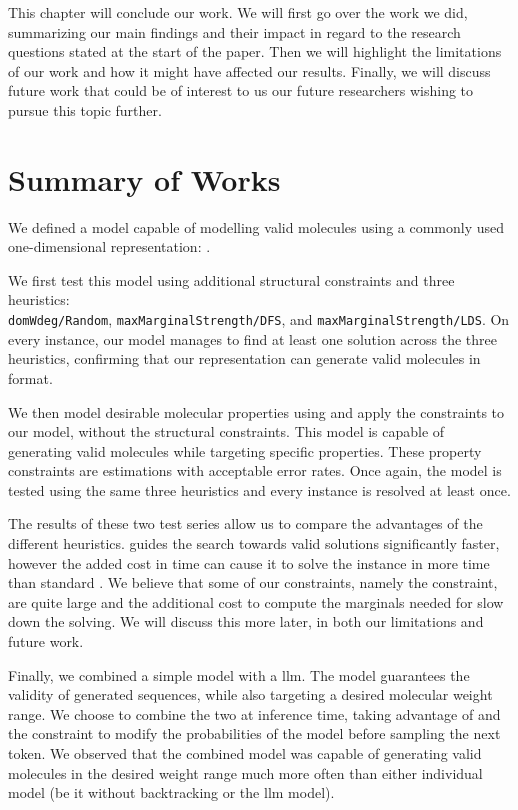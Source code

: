 \documentclass[../Document.tex]{subfiles}
\begin{document}
\label{chap:conclusion}
This chapter will conclude our work.
We will first go over the work we did, summarizing our main findings and their impact in regard to the research questions stated at the start of the paper.
Then we will highlight the limitations of our work and how it might have affected our results.
Finally, we will discuss future work that could be of interest to us our future researchers wishing to pursue this topic further.

\section{Summary of Works}
\label{sec:conc/summary}
We defined a model capable of modelling valid molecules using a commonly used one-dimensional representation: \smiles.

We first test this model using additional structural constraints and three heuristics:\\ \texttt{domWdeg/Random}, \texttt{maxMarginalStrength/DFS}, and \texttt{maxMarginalStrength/LDS}.
On every instance, our model manages to find at least one solution across the three heuristics, confirming that our representation can generate valid molecules in \smiles format.

We then model desirable molecular properties using \cp and apply the constraints to our model, without the structural constraints.
This model is capable of generating valid molecules while targeting specific properties.
These property constraints are estimations with acceptable error rates.
Once again, the model is tested using the same three heuristics and every instance is resolved at least once.

The results of these two test series allow us to compare the advantages of the different heuristics. \bp guides the search towards valid solutions significantly faster, however the added cost in time can cause it to solve the instance in more time than standard \cp.
We believe that some of our constraints, namely the \grammar constraint, are quite large and the additional cost to compute the marginals needed for \bp slow down the solving. We will discuss this more later, in both our limitations and future work.

Finally, we combined a simple \cp model with a \gls{llm}.
The \cp model guarantees the validity of generated sequences, while also targeting a desired molecular weight range.
We choose to combine the two at inference time, taking advantage of \bp and the \oracle constraint to modify the probabilities of the model before sampling the next token.
We observed that the combined model was capable of generating valid molecules in the desired weight range much more often than either individual model (be it \cp without backtracking or the \gls{llm} model).
\end{document}
